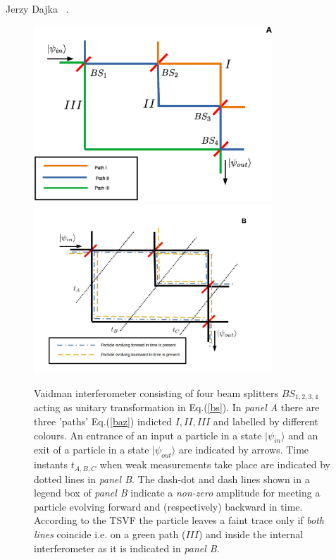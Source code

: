 \begin{artengenv}{Jerzy Dajka}
~\parencite{PhysRevA.95.032110,PhysRevA.97.046102,PhysRevA.97.046103,vaid_trans,lady}. 
\begin{figure}
 \includegraphics[width=0.8\textwidth]{ART_dajka/vaid1a.eps}\\%
 \includegraphics[width=0.8\textwidth]{ART_dajka/vaid1b.jpg}%
 \caption{Vaidman  interferometer consisting of four beam splitters $BS_{1,2,3,4}$ acting as unitary transformation in Eq.(\ref{bs}). In  {\it panel A} there are  three 'paths' Eq.(\ref{baz}) indicted  $I,II,III$ and labelled by different colours. An entrance of an input a particle in a state $|\psi_{in}\rangle$ and an exit of a particle in a state $|\psi_{out}\rangle$ are indicated by arrows. Time instants  $t_{A,B,C}$ when  weak measurements take place are indicated by dotted lines in  {\it panel B}. The dash-dot and dash lines shown in a legend box of {\it panel B} indicate  a {\it non-zero} amplitude for meeting a particle evolving forward and (respectively) backward in time. According to the TSVF the particle leaves a faint trace only if {\it both lines} coincide i.e. on a green path ($III$) and inside the internal interferometer as it is indicated in {\it panel B}.}\label{fig0}
\end{figure}


\end{artengenv}
